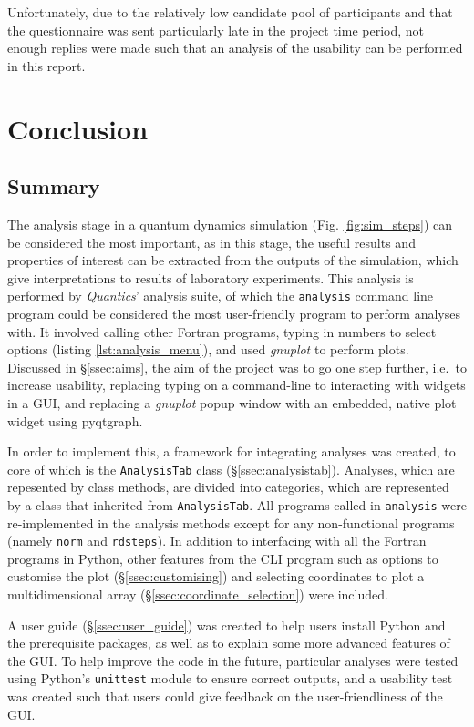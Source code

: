 \documentclass[12pt]{article}
\begin{document}
Unfortunately, due to the relatively low candidate pool of participants and that the questionnaire was sent particularly late in the project time period, not enough replies were made such that an analysis of the usability can be performed in this report.

\section{Conclusion}\label{sec:conclusion}

\subsection{Summary}\label{ssec:summary}

The analysis stage in a quantum dynamics simulation (Fig. \ref{fig:sim_steps}) can be considered the most important, as in this stage, the useful results and properties of interest can be extracted from the outputs of the simulation, which give interpretations to results of laboratory experiments. This analysis is performed by \textit{Quantics}' analysis suite, of which the \texttt{analysis} command line program could be considered the most user-friendly program to perform analyses with. It involved calling other Fortran programs, typing in numbers to select options (listing \ref{lst:analysis_menu}), and used \textit{gnuplot} to perform plots. Discussed in \S\ref{ssec:aims}, the aim of the project was to go one step further, i.e.~to increase usability, replacing typing on a command-line to interacting with widgets in a GUI, and replacing a \textit{gnuplot} popup window with an embedded, native plot widget using pyqtgraph.

In order to implement this, a framework for integrating analyses was created, to core of which is the \texttt{AnalysisTab} class (\S\ref{ssec:analysistab}). Analyses, which are repesented by class methods, are divided into categories, which are represented by a class that inherited from \texttt{AnalysisTab}. All programs called in \texttt{analysis} were re-implemented in the analysis methods except for any non-functional programs (namely \texttt{norm} and \texttt{rdsteps}). In addition to interfacing with all the Fortran programs in Python, other features from the CLI program such as options to customise the plot (\S\ref{ssec:customising}) and selecting coordinates to plot a multidimensional array (\S\ref{ssec:coordinate_selection}) were included.

A user guide (\S\ref{ssec:user_guide}) was created to help users install Python and the prerequisite packages, as well as to explain some more advanced features of the GUI. To help improve the code in the future, particular analyses were tested using Python's \texttt{unittest} module to ensure correct outputs, and a usability test was created such that users could give feedback on the user-friendliness of the GUI.
\end{document}
